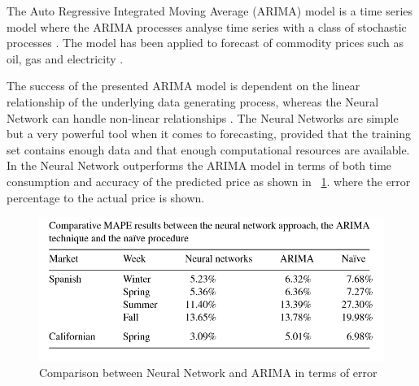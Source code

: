 The Auto Regressive Integrated Moving Average (ARIMA) model is a time series model where the ARIMA processes analyse time series with a class of stochastic processes \cite{EnergyPriceForecasting,ARIMA}. The model has been applied to forecast of commodity prices such as oil, gas and electricity \cite{ARIMA}. 

The success of the presented ARIMA model is dependent on the linear relationship of the underlying data generating process, whereas the Neural Network can handle non-linear relationships \cite{1}. The Neural Networks are simple but a very powerful tool when it comes to forecasting, provided that the training set contains enough data and that enough computational resources are available. 
In \cite{1} the Neural Network outperforms the ARIMA model in terms of both time consumption and accuracy of the predicted price as shown in ~\ref{fig:ArimaVSNN}. where the error percentage to the actual price is shown.
\begin{figure}[h!]
\centering
\includegraphics[width=0.8\linewidth,natwidth=898,natheight=587]{billeder/ARIMAvsNN.png}
\caption{Comparison between Neural Network and ARIMA in terms of error \cite{1}}
\label{fig:ArimaVSNN}
\end{figure}